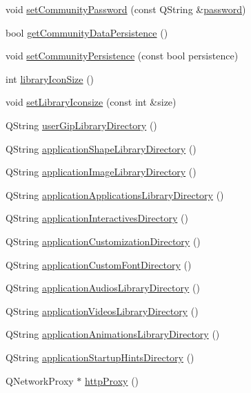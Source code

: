 \begin{DoxyCompactItemize}
\item 
void \hyperlink{class_u_b_settings_adedfe664eb6909d957d09b89d5e761eb}{set\-Community\-Password} (const Q\-String \&\hyperlink{class_u_b_settings_a777d499c976f274487411b565b278e16}{password})
\item 
bool \hyperlink{class_u_b_settings_a6ccb4f53241170bf50814fff86cc899e}{get\-Community\-Data\-Persistence} ()
\item 
void \hyperlink{class_u_b_settings_a6ebeb7cab5dc47ffc530e66ec7be1568}{set\-Community\-Persistence} (const bool persistence)
\item 
int \hyperlink{class_u_b_settings_af0b36554a4d969ac48168da6e314f843}{library\-Icon\-Size} ()
\item 
void \hyperlink{class_u_b_settings_acf1f904d5a6f3d5fbcc2aa263fb05757}{set\-Library\-Iconsize} (const int \&size)
\item 
Q\-String \hyperlink{class_u_b_settings_a3c4a52b1b0c5faf385b35a9b599719da}{user\-Gip\-Library\-Directory} ()
\item 
Q\-String \hyperlink{class_u_b_settings_a924431dddcc39861281c57eefa4cda2c}{application\-Shape\-Library\-Directory} ()
\item 
Q\-String \hyperlink{class_u_b_settings_a8029e1b1c6ea36388f3a70c9b7994b21}{application\-Image\-Library\-Directory} ()
\item 
Q\-String \hyperlink{class_u_b_settings_aa9ace0a89ba6b56d49221164a3d5c9c3}{application\-Applications\-Library\-Directory} ()
\item 
Q\-String \hyperlink{class_u_b_settings_a77996606a9d8eba82b5b429b77cf8c20}{application\-Interactives\-Directory} ()
\item 
Q\-String \hyperlink{class_u_b_settings_a7fe813cc5c24f87615cdeb7a33c2b890}{application\-Customization\-Directory} ()
\item 
Q\-String \hyperlink{class_u_b_settings_adcdef136a2f203e0ddf283196fff991a}{application\-Custom\-Font\-Directory} ()
\item 
Q\-String \hyperlink{class_u_b_settings_a2b1b2d7898677bff8cc68aacd6329ae4}{application\-Audios\-Library\-Directory} ()
\item 
Q\-String \hyperlink{class_u_b_settings_a90185dbd91d23f4a8c12e1efb36a8ae5}{application\-Videos\-Library\-Directory} ()
\item 
Q\-String \hyperlink{class_u_b_settings_a1684a636cf9afe7d736c103cc50aea54}{application\-Animations\-Library\-Directory} ()
\item 
Q\-String \hyperlink{class_u_b_settings_ab4cfad68b74a159d257e3a9a5c2df85f}{application\-Startup\-Hints\-Directory} ()
\item 
Q\-Network\-Proxy $\ast$ \hyperlink{class_u_b_settings_a4639b92e16c88b61deaa44d39eebc6c3}{http\-Proxy} ()
\end{DoxyCompactItemize}
